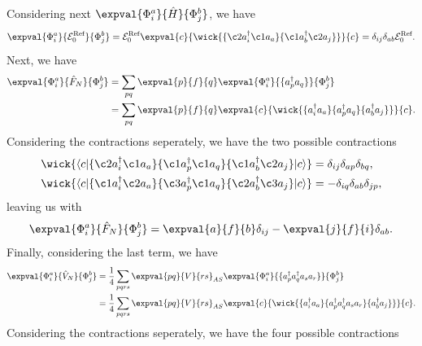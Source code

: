 Considering next $\expval{\Phi_i^a}{\hat{H}}{\Phi_{j}^{b}}$, we have
\begin{equation*}
    \expval{\Phi_i^a}{\mathcal{E}_0^{\text{Ref}}}{\Phi_{j}^{b}} = \mathcal{E}_0^{\text{Ref}}
    \expval{c}{\wick{
            \{ \c2 a_i^\dagger \c1 a_a \}
            \{ \c1 a_b^\dagger \c2 a_j \}
        }
    }{c}
    = \delta_{ij} \delta_{ab} \mathcal{E}_0^{\text{Ref}}.
\end{equation*}
Next, we have
\begin{align*}
    \expval{\Phi_i^a}{\hat{F}_N}{\Phi_{j}^{b}}
    &= \sum_{pq} \expval{p}{f}{q} \expval{\Phi_i^a}{\{ a_p^\dagger a_q \}}{\Phi_{j}^{b}} \\
    &= \sum_{pq}
    \expval{p}{f}{q}
    \expval{c}{
        \wick{
            \{ a_i^\dagger a_a \}
            \{ a_p^\dagger a_q \}
            \{ a_b^\dagger a_j \}
        }
    }{c}.
\end{align*}
Considering the contractions seperately, we have the two possible contractions
\begin{align*}
    \wick{
        \langle c \vert
        \{ \c2 a_i^\dagger \c1 a_a \}
        \{ \c1 a_p^\dagger \c1 a_q \}
        \{ \c1 a_b^\dagger \c2 a_j \}
        \vert c \rangle
    }
    &= \delta_{ij} \delta_{ap} \delta_{bq}, \\
    \wick{
        \langle c \vert
        \{ \c1 a_i^\dagger \c2 a_a \}
        \{ \c3 a_p^\dagger \c1 a_q \}
        \{ \c2 a_b^\dagger \c3 a_j \}
        \vert c \rangle
    } &= -\delta_{iq} \delta_{ab} \delta_{jp},
\end{align*}
leaving us with
\begin{equation*}
    \expval{\Phi_i^a}{\hat{F}_N}{\Phi_{j}^{b}} = \expval{a}{f}{b} \delta_{ij} - \expval{j}{f}{i} \delta_{ab}.
\end{equation*}
Finally, considering the last term, we have
\begin{align*}
    \expval{\Phi_i^a}{\hat{V}_N}{\Phi_{j}^{b}}
    &= \frac{1}{4} \sum_{pqrs} \expval{pq}{V}{rs}_{AS} \expval{\Phi_i^a}{\{a_p^\dagger a_q^\dagger a_s a_r\}}{\Phi_{j}^{b}} \\
    &= \frac{1}{4} \sum_{pqrs} \expval{pq}{V}{rs}_{AS} \expval{c}{
        \wick{
            \{ a_i^\dagger a_a \}
            \{ a_p^\dagger a_q^\dagger a_s a_r \}
            \{ a_b^\dagger a_j \}
        }
    }{c}.
\end{align*}
Considering the contractions seperately, we have the four possible contractions
